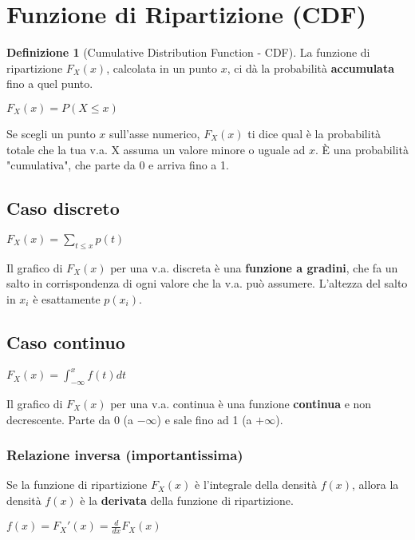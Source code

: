 \documentclass[a4paper, 11pt]{article}
\theoremstyle{definition}
\newtheorem{definizione}{Definizione}[section]
\begin{document}
\section{Funzione di Ripartizione (CDF)}
\begin{definizione}[Cumulative Distribution Function - CDF]
La funzione di ripartizione $F_X(x)$, calcolata in un punto $x$, ci dà la probabilità \textbf{accumulata} fino a quel punto.
\begin{formulabox}
    $F_X(x) = P(X \le x)$
\end{formulabox}
Se scegli un punto $x$ sull'asse numerico, $F_X(x)$ ti dice qual è la probabilità totale che la tua v.a. X assuma un valore minore o uguale ad $x$. È una probabilità "cumulativa", che parte da 0 e arriva fino a 1.
\end{definizione}

\subsection{Caso discreto}
\begin{formulabox}
    $F_X(x) = \sum_{t \le x} p(t)$
\end{formulabox}
Il grafico di $F_X(x)$ per una v.a. discreta è una \textbf{funzione a gradini}, che fa un salto in corrispondenza di ogni valore che la v.a. può assumere. L'altezza del salto in $x_i$ è esattamente $p(x_i)$.

\subsection{Caso continuo}
\begin{formulabox}
    $F_X(x) = \int_{-\infty}^{x} f(t) dt$
\end{formulabox}
Il grafico di $F_X(x)$ per una v.a. continua è una funzione \textbf{continua} e non decrescente. Parte da 0 (a $-\infty$) e sale fino ad 1 (a $+\infty$).

\subsubsection*{Relazione inversa (importantissima)}
Se la funzione di ripartizione $F_X(x)$ è l'integrale della densità $f(x)$, allora la densità $f(x)$ è la \textbf{derivata} della funzione di ripartizione.
\begin{formulabox}
    $f(x) = F_X'(x) = \frac{d}{dx}F_X(x)$
\end{formulabox}
\end{document}
